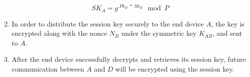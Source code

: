 \begin{enumerate}
\begin{equation}
\label{eq:ska}
SK_A = g^{\ Pk_{D}\ *\ Sk_B} \mod P
\end{equation}

\item In order to distribute the session key securely to the end device $A$, the key is encrypted along with the nonce $N_B$ under the symmetric key $K_{AB}$, and sent to $A$.

\item After the end device successfully decrypts and retrieves its session key, future communication between $A$ and $D$ will be encrypted using the session key. 

\end{enumerate}




%
%


